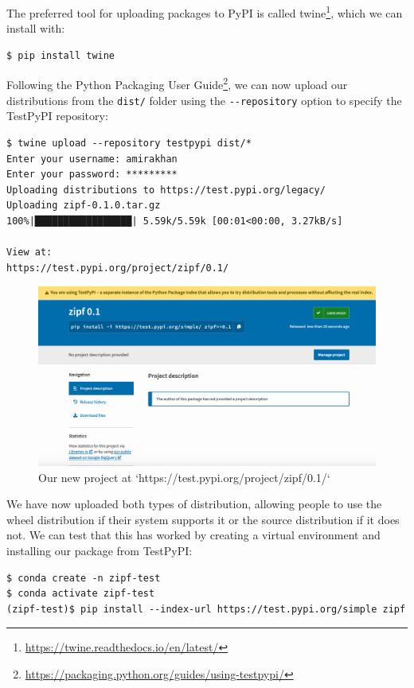 \documentclass[
]{krantz}
\renewcommand{\href}[2]{#2\footnote{\url{#1}}}
\begin{document}
The preferred tool for uploading packages to PyPI is called \href{https://twine.readthedocs.io/en/latest/}{twine},
which we can install with:

\begin{verbatim}
$ pip install twine
\end{verbatim}

Following the \href{https://packaging.python.org/guides/using-testpypi/}{Python Packaging User Guide},
we can now upload our distributions from the \texttt{dist/} folder
using the \texttt{-\/-repository} option to specify the TestPyPI repository:

\begin{verbatim}
$ twine upload --repository testpypi dist/*
Enter your username: amirakhan
Enter your password: *********
Uploading distributions to https://test.pypi.org/legacy/
Uploading zipf-0.1.0.tar.gz
100%|█████████████████| 5.59k/5.59k [00:01<00:00, 3.27kB/s]

View at:
https://test.pypi.org/project/zipf/0.1/
\end{verbatim}

\begin{figure}

{\centering \includegraphics[width=1\linewidth]{figures/packaging/testpypi} 

}

\caption{Our new project at `https://test.pypi.org/project/zipf/0.1/`}\label{fig:packaging-testpypi}
\end{figure}

We have now uploaded both types of distribution,
allowing people to use the wheel distribution if their system supports it
or the source distribution if it does not.
We can test that this has worked
by creating a virtual environment
and installing our package from TestPyPI:

\begin{verbatim}
$ conda create -n zipf-test
$ conda activate zipf-test
(zipf-test)$ pip install --index-url https://test.pypi.org/simple zipf
\end{verbatim}
\end{document}
